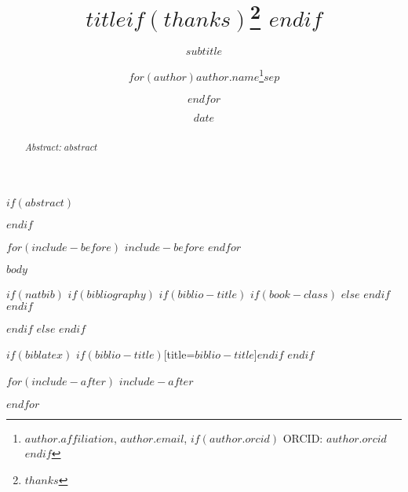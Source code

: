 \documentclass[11pt, a4paper, oneside]{article}
\title{$title$$if(thanks)$\thanks{$thanks$} $endif$ }
\subtitle{$subtitle$}
\author{$for(author)$$author.name$\thanks{$author.affiliation$, \texttt{$author.email$}, $if(author.orcid)$ ORCID: \href{https://orcid.org/$author.orcid$}{$author.orcid$}$endif$}$sep$\and $endfor$}
\institute{$for(author)$$author.affiliation$$sep$ \and $endfor$}
\date{$date$}
\begin{document}

\thispagestyle{empty}


\normalsize
\pagestyle{fancy}

$if(abstract)$
\begin{abstract}
\vspace{-1cm}\noindent \emph{Abstract:} $abstract$
\end{abstract}
$endif$

$for(include-before)$
$include-before$
$endfor$

$body$

$if(natbib)$
  $if(bibliography)$
    $if(biblio-title)$
      $if(book-class)$
        \renewcommand\bibname{$biblio-title$}
      $else$
        \renewcommand\refname{$biblio-title$}
      $endif$
    $endif$
    
  $endif$
$else$
$endif$

$if(biblatex)$
\printbibliography$if(biblio-title)$[title=$biblio-title$]$endif$
$endif$

$for(include-after)$
$include-after$

$endfor$
\end{document}
